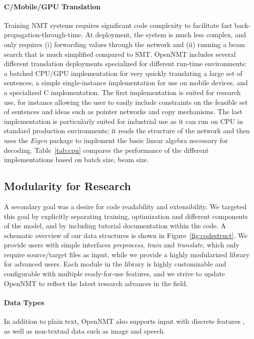\documentclass[]{article}
\begin{document}
\paragraph{C/Mobile/GPU Translation} Training NMT systems requires
significant code complexity to facilitate fast
back-propagation-through-time. At deployment, the system is much less
complex, and only requires (i) forwarding values through the network
and (ii) running a beam search that is much simplified compared to
SMT. OpenNMT includes several different translation deployments
specialized for different run-time environments: a batched CPU/GPU
implementation for very quickly translating a large set of sentences,
a simple single-instance implementation for use on mobile devices, and
a specialized C implementation. The first implementation is suited for
research use, for instance allowing the user to easily include
constraints on the feasible set of sentences and ideas such as pointer
networks and copy mechanisms. The last implementation is particularly
suited for industrial use as it can run on CPU in standard production
environments; it reads the structure of the network and then uses the
\textit{Eigen} package to implement the basic linear algebra necessary
for decoding. Table~\ref{tab:cpu} compares the performance of the
different implementations based on batch size, beam size.




\subsection{Modularity for Research}

A secondary goal was a desire for code readability and extensibility.
We targeted this goal by explicitly separating training, optimization and different components of the model, and by including tutorial documentation within
the code. A schematic overview of our data structures is shown in Figure~\ref{fig:codestruct}. We provide users with simple interfaces \textit{preprocess}, \textit{train} and \textit{translate}, which only require source/target files as input, while we provide a highly modularized library for advanced users. Each module in the library is highly customizable and configurable with multiple ready-for-use features, and we strive to update OpenNMT to reflect the latest research advances in the field.

\paragraph{Data Types} In addition to plain text, OpenNMT also supports input with discrete features \citep{sennrich2016linguistic}, as well as non-textual data such as image and speech. 
\end{document}
